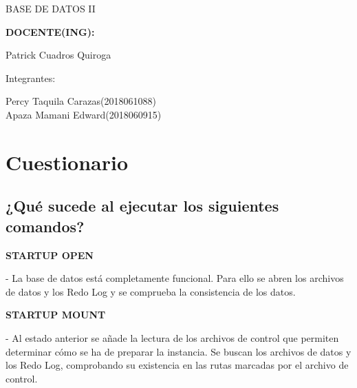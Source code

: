 \documentclass[12pt,letterpaper]{article}
\begin{document}
\begin{titlepage}
\begin{center}
\vspace*{0.1in}
\begin{large}
BASE DE DATOS II\\
\end{large}

\vspace*{0.3in}
\begin{Large}
\textbf{DOCENTE(ING):} \\
\end{Large}

\vspace*{0.1in}
\begin{large}
 Patrick Cuadros Quiroga\\
\end{large}

\vspace*{0.2in}
\vspace*{0.1in}
\begin{large}
Integrantes: \\
\begin{flushleft}
Percy Taquila Carazas\hfill	(2018061088) \\
Apaza Mamani Edward\hfill	(2018060915) \\
\end{flushleft}
\end{large}
\end{center}

\end{titlepage}

\tableofcontents %
\thispagestyle{empty} %
\newpage
\setcounter{page}{1} %




\section{Cuestionario}
\subsection{¿Qué sucede al ejecutar los siguientes comandos?} 

\textbf{STARTUP OPEN} \ 
\begin{itemize}
- La base de datos está completamente funcional. Para ello se abren los archivos de datos y los Redo Log y se comprueba la consistencia de los datos.\\
\end{itemize} 


\textbf{STARTUP MOUNT} \ 
\begin{itemize}
- Al estado anterior se añade la lectura de los archivos de control que permiten determinar cómo se ha de preparar la instancia. Se buscan los archivos de datos y los Redo Log, comprobando su existencia en las rutas marcadas por el archivo de control.\\
\end{itemize} 
\end{document}
